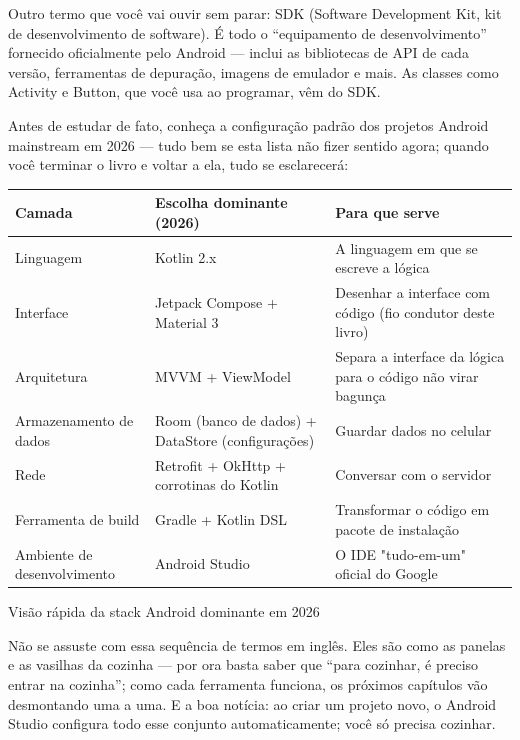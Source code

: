 Outro termo que você vai ouvir sem parar: SDK (Software Development Kit, kit de desenvolvimento de software). É todo o “equipamento de desenvolvimento” fornecido oficialmente pelo Android — inclui as bibliotecas de API de cada versão, ferramentas de depuração, imagens de emulador e mais. As classes como Activity e Button, que você usa ao programar, vêm do SDK.


Antes de estudar de fato, conheça a configuração padrão dos projetos Android mainstream em 2026 — tudo bem se esta lista não fizer sentido agora; quando você terminar o livro e voltar a ela, tudo se esclarecerá:

\begin{center}
\begin{tabularx}{\linewidth}{|X|X|X|}
\hline
\textbf{Camada} & \textbf{Escolha dominante (2026)} & \textbf{Para que serve} \tabularnewline
\hline
Linguagem & Kotlin 2.x & A linguagem em que se escreve a lógica \tabularnewline
Interface & Jetpack Compose + Material 3 & Desenhar a interface com código (fio condutor deste livro) \tabularnewline
Arquitetura & MVVM + ViewModel & Separa a interface da lógica para o código não virar bagunça \tabularnewline
Armazenamento de dados & Room (banco de dados) + DataStore (configurações) & Guardar dados no celular \tabularnewline
Rede & Retrofit + OkHttp + corrotinas do Kotlin & Conversar com o servidor \tabularnewline
Ferramenta de build & Gradle + Kotlin DSL & Transformar o código em pacote de instalação \tabularnewline
Ambiente de desenvolvimento & Android Studio & O IDE "tudo-em-um" oficial do Google \tabularnewline
\hline
\end{tabularx}
\end{center}

\begin{center}\small\color{gray}Visão rápida da stack Android dominante em 2026\end{center}

Não se assuste com essa sequência de termos em inglês. Eles são como as panelas e as vasilhas da cozinha — por ora basta saber que “para cozinhar, é preciso entrar na cozinha”; como cada ferramenta funciona, os próximos capítulos vão desmontando uma a uma. E a boa notícia: ao criar um projeto novo, o Android Studio configura todo esse conjunto automaticamente; você só precisa cozinhar.


